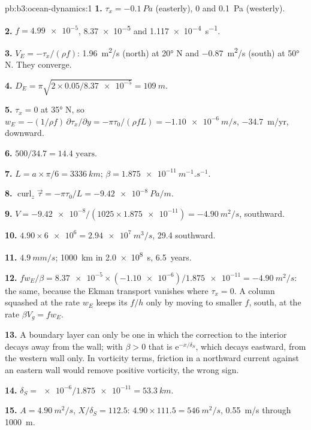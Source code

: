 \begin{solution}{pb:b3:ocean-dynamics:1}
\textbf{1.} $\tau_x = \qty{-0.1}{Pa}$ (easterly), 0 and \qty{+0.1}{Pa}
(westerly).

\textbf{2.} $f = \num{4.99e-5}$, \num{8.37e-5} and
\qty{1.117e-4}{s^{-1}}.

\textbf{3.} $V_E = -\tau_x/(\rho f)$: \qty{+1.96}{m^2/s} (north) at
\ang{20} N and \qty{-0.87}{m^2/s} (south) at \ang{50} N. They converge.

\textbf{4.} $D_E = \pi\sqrt{2\times0.05/\num{8.37e-5}} = \qty{109}{m}$.

\textbf{5.} $\tau_x = 0$ at \ang{35} N, so $w_E = -(1/\rho f)\,
\partial\tau_x/\partial y = -\pi\tau_0/(\rho fL) = \qty{-1.10e-6}{m/s}$,
\qty{-34.7}{m/yr}, downward.

\textbf{6.} $500/34.7 = \num{14.4}\text{ years}$.

\textbf{7.} $L = a\times\pi/6 = \qty{3336}{km}$; $\beta =
\qty{1.875e-11}{m^{-1}.s^{-1}}$.

\textbf{8.} $\operatorname{curl}_z\vec\tau = -\pi\tau_0/L =
\qty{-9.42e-8}{Pa/m}$.

\textbf{9.} $V = \num{-9.42e-8}/(1025\times\num{1.875e-11}) =
\qty{-4.90}{m^2/s}$, southward.

\textbf{10.} $4.90\times\num{6e6} = \qty{2.94e7}{m^3/s}$,
\qty{29.4}{\sverdrup} southward.

\textbf{11.} $\qty{4.9}{mm/s}$; \qty{1000}{km} in \qty{2.0e8}{s},
\num{6.5}~years.

\textbf{12.} $fw_E/\beta = \num{8.37e-5}\times(\num{-1.10e-6})/
\num{1.875e-11} = \qty{-4.90}{m^2/s}$: the same, because the Ekman
transport vanishes where $\tau_x = 0$. A column squashed at the rate $w_E$
keeps its  $f/h$ only by moving to smaller $f$, south,
at the rate $\beta V_g = fw_E$.

\textbf{13.} A boundary layer can only be one in which the correction to
the interior decays away from the wall; with $\beta > 0$ that is
$\mathrm e^{-x/\delta_S}$, which decays eastward, from the western wall
only. In vorticity terms, friction in a northward current against an
eastern wall would remove positive vorticity, the wrong sign.

\textbf{14.} $\delta_S = \num{e-6}/\num{1.875e-11} = \qty{53.3}{km}$.

\textbf{15.} $A = \qty{4.90}{m^2/s}$, $X/\delta_S = 112.5$:
$4.90\times111.5 = \qty{546}{m^2/s}$, \qty{0.55}{m/s} through
\qty{1000}{m}.


\end{solution}
